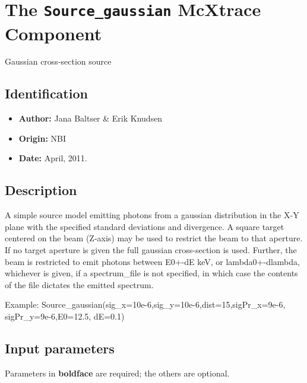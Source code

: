 \section{The \texttt{Source\_gaussian} McXtrace Component}
Gaussian cross-section source

\subsection*{Identification}
\begin{itemize}
  \item \textbf{Author:} Jana Baltser \& Erik Knudsen
  \item \textbf{Origin:} NBI
  \item \textbf{Date:} April, 2011.
\end{itemize}

\subsection*{Description}
A simple source model emitting photons from a gaussian distribution in the X-Y plane with the specified standard deviations and divergence. A square target centered on the beam (Z-axis) may be used to restrict the beam to that aperture. If no target aperture is given the full gaussian cross-section is used. Further, the beam is restricted to emit photons between E0+-dE keV, or lambda0+-dlambda, whichever is given, if a spectrum\_file is not specified, in which case the contents of the file dictates the emitted spectrum.

Example: Source\_gaussian(sig\_x=10e-6,sig\_y=10e-6,dist=15,sigPr\_x=9e-6, sigPr\_y=9e-6,E0=12.5, dE=0.1)

\subsection*{Input parameters}
Parameters in \textbf{boldface} are required; the others are optional.

